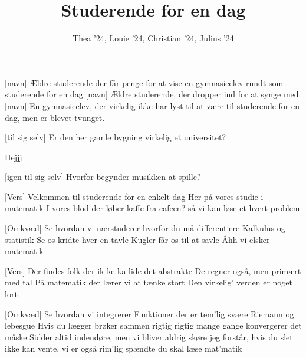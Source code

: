 \documentclass[a4paper,11pt]{article}
\title{Studerende for en dag}
\author{Thea '24, Louie '24, Christian '24, Julius '24}
\begin{document}
\maketitle

\begin{roles}
[navn] Ældre studerende der får penge for at vise en gymnasieelev rundt som studerende for en dag
[navn] Ældre studerende, der dropper ind for at synge med. 
[navn] En gymnasieelev, der virkelig ikke har lyst til at være til studerende for en dag, men er blevet tvunget.
\end{roles}


\begin{sketch}

[til sig selv] Er den her gamle bygning virkelig et universitet?


  Hejjj

[igen til sig selv] Hvorfor begynder musikken at spille?

\end{sketch}


\begin{song}
  [Vers] Velkommen til studerende for en enkelt dag  
Her på vores studie i matematik
I vores blod der løber kaffe fra cafeen?
så vi kan løse et hvert problem

[Omkvæd]
Se hvordan vi nærstuderer
hvorfor du må differentiere
Kalkulus og statistik
Se os kridte hver en tavle
Kugler får os til at savle
Åhh vi elsker matematik

[Vers]
Der findes folk der ik-ke ka lide det abstrakte
De regner også, men primært med tal
På matematik der lærer vi at tænke stort
Den virkelig' verden er noget lort

[Omkvæd]
Se hvordan vi integrerer
Funktioner der er tem'lig svære
Riemann og lebesgue
Hvis du lægger brøker sammen
rigtig rigtig mange gange
konvergerer det måske
Sidder altid indendøre, men vi bliver aldrig skøre
jeg forstår, hvis du slet ikke kan vente,
vi er også rim'lig spændte
du skal læse mat'matik

\end{song}
\end{document}
